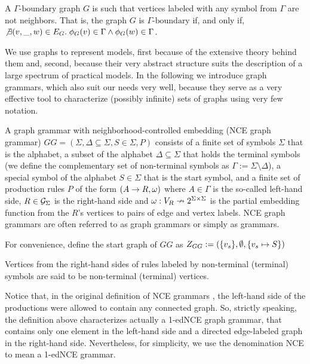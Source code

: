 \documentclass[]{report}
\begin{document}
\begin{definition}
	A $\Gamma\text{-boundary}$ graph $G$ is such that vertices labeled with any symbol from $\Gamma$ are not neighbors. That is, the graph $G$ is $\Gamma\text{-boundary}$ if, and only if, $\not\exists (v,\_,w) \in E_G \. \phi_G(v) \in \Gamma \land \phi_G(w) \in \Gamma$.
\end{definition}

We use graphs to represent models, first because of the extensive theory behind them and, second, because their very abstract structure suits the description of a large spectrum of practical models. In the following we introduce graph grammars, which also suit our needs very well, because they serve as a very effective tool to characterize (possibly infinite) sets of graphs using very few notation.

\begin{definition}
	\label{def:gg}
	A graph grammar with neighborhood-controlled embedding (NCE graph grammar) $GG = (\Sigma, \Delta \subseteq \Sigma, S \in \Sigma, P)$ consists of a finite set of symbols $\Sigma$ that is the alphabet, a subset of the alphabet $\Delta \subseteq \Sigma$ that holds the terminal symbols (we define the complementary set of non-terminal symbols as $\Gamma := \Sigma \setminus \Delta$), a special symbol of the alphabet $S \in \Sigma$ that is the start symbol, and a finite set of production rules $P$ of the form $(A \pro R, \omega)$ where $A \in \Gamma$ is the so-called left-hand side, $R \in \allgraphs{\Sigma}$ is the right-hand side and $\omega : V_R \pto 2^{\Sigma \times \Sigma}$ is the partial embedding function from the $R$'s vertices to pairs of edge and vertex labels. NCE graph grammars are often referred to as graph grammars or simply as grammars.
	
	For convenience, define the start graph of $GG$ as $\startG{GG} := (\{v_s\},\emptyset,\{v_s \mapsto S\})$
	
	Vertices from the right-hand sides of rules labeled by non-terminal (terminal) symbols are said to be non-terminal (terminal) vertices.
\end{definition}

Notice that, in the original definition of NCE grammars \cite{janssens1982graph}, the left-hand side of the productions were allowed to contain any connected graph. So, strictly speaking, the definition above characterizes actually a 1-edNCE graph grammar, that contains only one element in the left-hand side and a directed edge-labeled graph in the right-hand side. Nevertheless, for simplicity, we use the denomination NCE to mean a 1-edNCE grammar.
\end{document}
